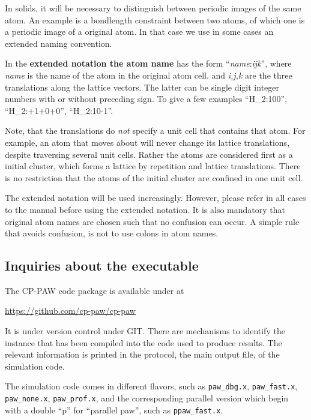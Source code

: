 \documentclass[final,12pt]{article}
\begin{document}
In solids, it will be necessary to distinguish between periodic images
of the same atom. An example is a bondlength constraint between two
atoms, of which one is a periodic image of a original atom. In that
case we use in some cases an extended naming convention.

In the \textbf{extended notation the atom name} has the form
``\textit{name}:\textit{ijk}'', where {\it name} is the name of the
atom in the original atom cell. and {\it i,j,k} are the three
translations along the lattice vectors. The latter can be single digit
integer numbers with or without preceding sign. To give a few
examples ``H\_2:100'', ``H\_2:+1+0+0'', ``H\_2:10-1''.

Note, that the translations do {\em not} specify a unit cell that
contains that atom. For example, an atom that moves about will never
change its lattice translations, despite traversing several unit
cells. Rather the atoms are considered first as a initial cluster, which forms
a lattice by repetition and lattice translations. There is no
restriction that the atoms of the initial cluster are confined in one
unit cell.

The extended notation will be used increasingly. However, please refer
in all cases to the manual before using the extended notation. It is
also mandatory that original atom names are chosen such that no
confusion can occur. A simple rule that avoids confusion, is not to
use colons in atom names.

\subsection{Inquiries about the executable}
The CP-PAW code package is available under at
\begin{center}
\url{https://github.com/cp-paw/cp-paw}
\end{center}

It is under version control under GIT. There are mechanisms to
identify the instance that has been compiled into the code used to
produce results. The relevant information is printed in the
protocol, the main output file, of the simulation code.

The simulation code comes in different flavors, such as
\verb|paw_dbg.x|, \verb|paw_fast.x|, \verb|paw_none.x|,
\verb|paw_prof.x|, and the corresponding parallel version which begin
with a double ``p'' for ``parallel paw'', such as \verb|ppaw_fast.x|.
\end{document}

